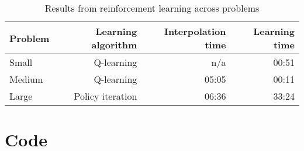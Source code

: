\documentclass[twoside,11pt]{article}
\begin{document}
\begin{table}[h]
    \begin{center}
    \begin{tabular}{lrrr}
         \textbf{Problem} & \textbf{Learning algorithm} & \textbf{Interpolation time} & \textbf{Learning time}\\
         \midrule
         Small & Q-learning & n/a & 00:51\\
         Medium & Q-learning & 05:05 & 00:11\\
         Large & Policy iteration & 06:36 & 33:24\\ 
        \bottomrule
    \end{tabular}
    \end{center}
    \caption{\label{tab:results} Results from reinforcement learning across problems}
\end{table}

\section{Code}
\end{document}
